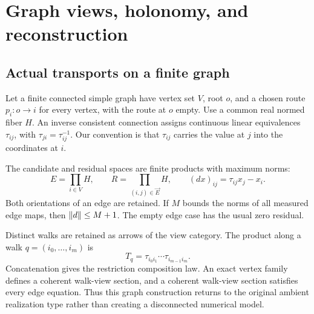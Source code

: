 \section{Graph views, holonomy, and reconstruction}\label{sec:graph}
\subsection{Actual transports on a finite graph}
Let a finite connected simple graph have vertex set \(V\), root \(o\), and a chosen route \(p_i:o\to i\) for every vertex, with the route at \(o\) empty. Use a common real normed fiber \(H\). An inverse consistent connection assigns continuous linear equivalences \(\tau_{ij}\), with \(\tau_{ji}=\tau_{ij}^{-1}\). Our convention is that \(\tau_{ij}\) carries the value at \(j\) into the coordinates at \(i\).

The candidate and residual spaces are finite products with maximum norms:
\[
 E=\prod_{i\in V}H,\qquad
 R=\prod_{(i,j)\in\vec E}H,\qquad
 (dx)_{ij}=\tau_{ij}x_j-x_i.
\]
Both orientations of an edge are retained. If \(M\) bounds the norms of all measured edge maps, then \(\left\lVert d\right\rVert\le M+1\). The empty edge case has the usual zero residual.

Distinct walks are retained as arrows of the view category. The product along a walk \(q=(i_0,\ldots,i_m)\) is
\[
 T_q=\tau_{i_0i_1}\cdots\tau_{i_{m-1}i_m}.
\]
Concatenation gives the restriction composition law. An exact vertex family defines a coherent walk-view section, and a coherent walk-view section satisfies every edge equation. Thus this graph construction returns to the original ambient realization type rather than creating a disconnected numerical model.

